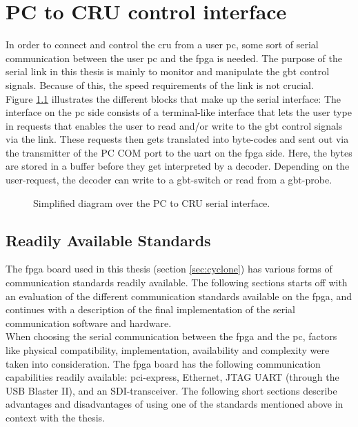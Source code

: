 \documentclass[main.tex]{subfiles}
\begin{document}
\chapter{PC to CRU control interface} \label{chap:sercom}

In order to connect and control the \gls{cru} from a user \acrshort{pc}, some sort of serial communication between the user \acrshort{pc} and the \gls{fpga} is needed. The purpose of the serial link in this thesis is mainly to monitor and manipulate the \gls{gbt} control signals. Because of this, the speed requirements of the link is not crucial. \\
Figure \ref{fig:sergui} illustrates the different blocks that make up the serial interface: The interface on the \acrshort{pc} side consists of a terminal-like interface that lets the user type in requests that enables the user to read and/or write to the \gls{gbt} control signals via the link. These requests then gets translated into byte-codes and sent out via the transmitter of the PC COM port to the \gls{uart} on the \gls{fpga} side. Here, the bytes are stored in a buffer before they get interpreted by a decoder. Depending on the user-request, the decoder can write to a \gls{gbt}-switch or read from a \gls{gbt}-probe.

\begin{figure} %

\caption{Simplified diagram over the PC to CRU serial interface.}
\label{fig:sergui}
\end{figure}

\section{Readily Available Standards}
The \gls{fpga} board used in this thesis (section \ref{sec:cyclone}) has various forms of communication standards readily available. The following sections starts off with an evaluation of the different communication standards available on the \gls{fpga}, and continues with a description of the final implementation of the serial communication software and hardware.\\

When choosing the serial communication between the \gls{fpga} and the \acrshort{pc}, factors like physical compatibility, implementation, availability and complexity were taken into consideration. The \gls{fpga} board has the following communication capabilities readily available: \gls{pci}-express, Ethernet, JTAG UART (through the USB Blaster II), and an SDI-transceiver. The following short sections describe advantages and disadvantages of using one of the standards mentioned above in context with the thesis.
\end{document}

